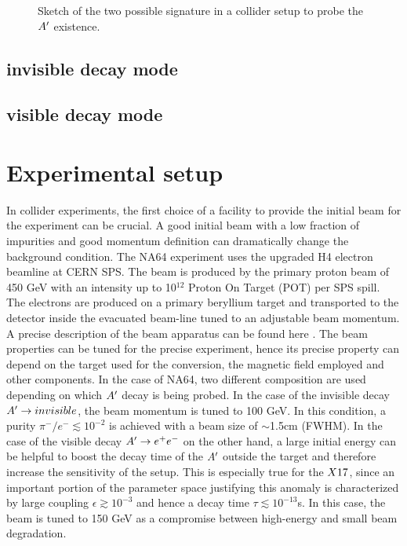\begin{figure}[bth!]
  \centering
  
  \caption[two signature sketch]{Sketch of the two possible signature in a collider setup to probe the $A'$ existence.}
  \label{fig:two-signature}
\end{figure}

\subsection{invisible decay mode}
\label{chapter2:sec:experimental-technique-invis}

\subsection{visible decay mode}
\label{chapter2:sec:experimental-technique-vis}

\section{Experimental setup}
\label{chapter2:sec:experimental-setup}

In collider experiments, the first choice of a facility to provide the initial beam for the experiment can be crucial. A good initial beam with a low fraction of impurities and good momentum definition can dramatically change the background condition. The NA64 experiment uses the upgraded H4 electron beamline at CERN SPS. The beam is produced by the primary proton beam of 450 \si{\giga\electronvolt} with an intensity up to 10$^{12}$ Proton On Target (POT) per SPS spill. The electrons are produced on a primary beryllium target and transported to the detector inside the evacuated beam-line tuned to an adjustable beam momentum. A precise description of the beam apparatus can be found here \cite{sps-beamline,h4-beamline}. The beam properties can be tuned for the precise experiment, hence its precise property can depend on the target used for the conversion, the magnetic field employed and other components. In the case of NA64, two different composition are used depending on which $A'$ decay is being probed. In the case of the invisible decay $A'\to invisible$, the beam momentum is tuned to 100 \si{\giga\electronvolt}. In this condition, a purity $\pi^-/e^- \lesssim 10^{-2}$ is achieved with a beam size of $\sim$1.5\si{cm} (FWHM). In the case of the visible decay $A' \to e^+e^-$ on the other hand, a large initial energy can be helpful to boost the decay time of the $A'$ outside the target and therefore increase the sensitivity of the setup. This is especially true for the $X17$, since an important portion of the parameter space justifying this anomaly is characterized by large coupling $\epsilon \gtrsim 10^{-3}$ and hence a decay time $\tau \lesssim 10^{-13}$\si{s}. In this case, the beam is tuned to 150 \si{\giga\electronvolt} as a compromise between high-energy and small beam degradation.

